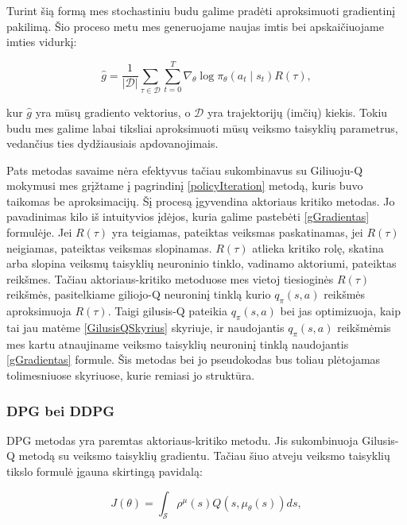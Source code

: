 \documentclass[a4paper, 12pt]{article}
\begin{document}
Turint šią formą mes stochastiniu budu galime pradėti aproksimuoti gradientinį pakilimą. Šio proceso metu mes generuojame naujas imtis bei apskaičiuojame imties vidurkį:

\begin{equation}
\label{gGradientas}
\hat{g}=\frac{1}{|\mathcal{D}|} \sum_{\tau \in \mathcal{D}} \sum_{t=0}^{T} \nabla_{\theta} \log \pi_{\theta}\left(a_{t} \mid s_{t}\right) R(\tau),
\end{equation}

kur $\hat{g}$ yra mūsų gradiento vektorius, o $\mathcal{D}$ yra trajektorijų (imčių) kiekis. Tokiu budu mes galime labai tiksliai aproksimuoti mūsų veiksmo taisyklių parametrus, vedančius ties dydžiausiais apdovanojimais. 

Pats metodas savaime nėra efektyvus tačiau sukombinavus su Giliuoju-Q mokymusi mes grįžtame į pagrindinį \ref{policyIteration} metodą, kuris buvo taikomas be aproksimacijų. Šį procesą įgyvendina aktoriaus kritiko metodas. Jo pavadinimas kilo iš intuityvios įdėjos, kuria galime pastebėti \ref{gGradientas} formulėje. Jei $R(\tau)$ yra teigiamas, pateiktas veiksmas paskatinamas, jei $R(\tau)$ neigiamas, pateiktas veiksmas slopinamas. $R(\tau)$ atlieka kritiko rolę, skatina arba slopina veiksmų taisyklių neuroninio tinklo, vadinamo aktoriumi, pateiktas reikšmes. Tačiau aktoriaus-kritiko metoduose mes vietoj tiesioginės $R(\tau)$ reikšmės, pasitelkiame giliojo-Q neuroninį tinklą kurio $q_{\pi}(s, a)$ reikšmės aproksimuoja $R(\tau)$. Taigi gilusis-Q pateikia $q_{\pi}(s, a)$ bei jas optimizuoja, kaip tai jau matėme \ref{GilusisQSkyrius} skyriuje, ir naudojantis $q_{\pi}(s, a)$ reikšmėmis mes kartu atnaujiname veiksmo taisyklių neuroninį tinklą naudojantis \ref{gGradientas} formule. Šis metodas bei jo pseudokodas bus toliau plėtojamas tolimesniuose skyriuose, kurie remiasi jo struktūra.

\subsubsection{DPG bei DDPG}

DPG\cite{DPG} metodas yra paremtas aktoriaus-kritiko metodu. Jis sukombinuoja Gilusis-Q metodą su veiksmo taisyklių gradientu. Tačiau šiuo atveju veiksmo taisyklių tikslo formulė įgauna skirtingą pavidalą:

\begin{equation}
J(\theta)=\int_{\mathcal{S}} \rho^{\mu}(s) Q\left(s, \mu_{\theta}(s)\right) d s,
\end{equation}
\end{document}
